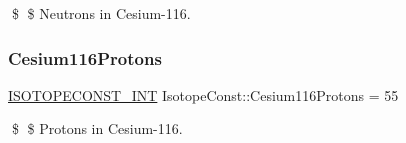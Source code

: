 \$ \$ Neutrons in Cesium-\/116. \mbox{\label{group___isotope_const-_cesium-_cs116_ga58bfe3a9089ac300508911b91f7a9814}} 
\subsubsection{\texorpdfstring{Cesium116\+Protons}{Cesium116Protons}}
{\footnotesize\ttfamily \mbox{\hyperlink{group___isotope_const-_macros_ga5f18360b3e99483a35c32d789e62621c}{I\+S\+O\+T\+O\+P\+E\+C\+O\+N\+S\+T\+\_\+\+I\+NT}} Isotope\+Const\+::\+Cesium116\+Protons = 55}

\$ \$ Protons in Cesium-\/116. 